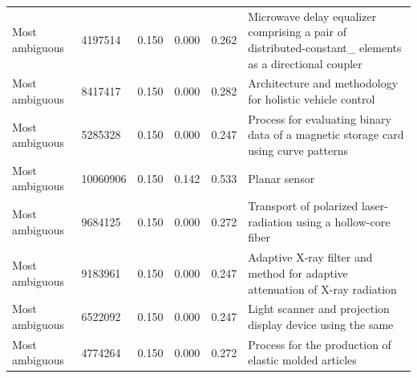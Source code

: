 \begin{tabular}{llrrrl}
Most ambiguous & 4197514 & 0.150 & 0.000 & 0.262 & Microwave delay equalizer comprising a pair of distributed-constant_ elements as a directional coupler \\
Most ambiguous & 8417417 & 0.150 & 0.000 & 0.282 & Architecture and methodology for holistic vehicle control \\
Most ambiguous & 5285328 & 0.150 & 0.000 & 0.247 & Process for evaluating binary data of a magnetic storage card using curve patterns \\
Most ambiguous & 10060906 & 0.150 & 0.142 & 0.533 & Planar sensor \\
Most ambiguous & 9684125 & 0.150 & 0.000 & 0.272 & Transport of polarized laser-radiation using a hollow-core fiber \\
Most ambiguous & 9183961 & 0.150 & 0.000 & 0.247 & Adaptive X-ray filter and method for adaptive attenuation of X-ray radiation \\
Most ambiguous & 6522092 & 0.150 & 0.000 & 0.247 & Light scanner and projection display device using the same \\
Most ambiguous & 4774264 & 0.150 & 0.000 & 0.272 & Process for the production of elastic molded articles \\
\bottomrule
\end{tabular}
